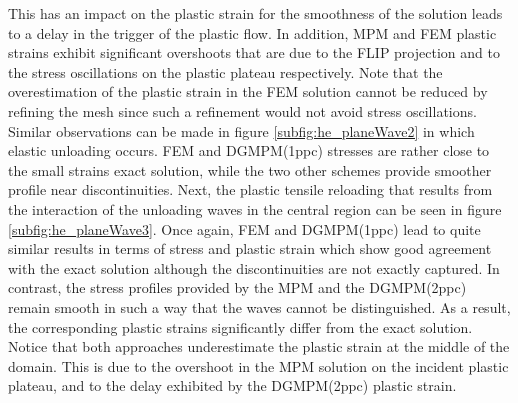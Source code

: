 This has an impact on the plastic strain for the smoothness of the solution leads to a delay in the trigger of the plastic flow.
In addition, MPM and FEM plastic strains exhibit significant overshoots that are due to the FLIP projection \cite{Thesis} and to the stress oscillations on the plastic plateau respectively.
Note that the overestimation of the plastic strain in the FEM solution cannot be reduced by refining the mesh since such a refinement would not avoid stress oscillations.
%
Similar observations can be made in figure \ref{subfig:he_planeWave2} in which elastic unloading occurs.
FEM and DGMPM(1ppc) stresses are rather close to the small strains exact solution, while the two other schemes provide smoother profile near discontinuities.
%
Next, the plastic tensile reloading that results from the interaction of the unloading waves in the central region can be seen in figure \ref{subfig:he_planeWave3}.
Once again, FEM and DGMPM(1ppc) lead to quite similar results in terms of stress and plastic strain which show good agreement with the exact solution although the discontinuities are not exactly captured.
In contrast, the stress profiles provided by the MPM and the DGMPM(2ppc) remain smooth in such a way that the waves cannot be distinguished.
As a result, the corresponding plastic strains significantly differ from the exact solution.
Notice that both approaches underestimate the plastic strain at the middle of the domain.
This is due to the overshoot in the MPM solution on the incident plastic plateau, and to the delay exhibited by the DGMPM(2ppc) plastic strain.

